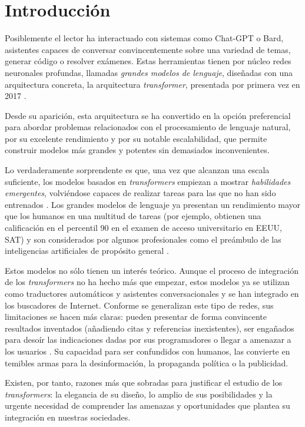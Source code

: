 \cleardoublepage

\chapter{Introducción}
Posiblemente el lector ha interactuado con sistemas como Chat-GPT o Bard, asistentes capaces de conversar convincentemente sobre una variedad de temas, generar código o resolver exámenes. Estas herramientas tienen por núcleo redes neuronales profundas, llamadas \textit{grandes modelos de lenguaje}, diseñadas con una arquitectura concreta, la arquitectura \textit{transformer}, presentada por primera vez en 2017 \cite{vaswani2017attention}.

Desde su aparición, esta arquitectura se ha convertido en la opción preferencial para abordar problemas relacionados con el procesamiento de lenguaje natural, por su excelente rendimiento y por su notable escalabilidad, que permite construir modelos más grandes y potentes sin demasiados inconvenientes. 

Lo verdaderamente sorprendente es que, una vez que alcanzan una escala suficiente, los modelos basados en \textit{transformers} empiezan a mostrar \textit{habilidades emergentes}, volviéndose capaces de realizar tareas para las que no han sido entrenados \cite{wei2022emergent}. Los grandes modelos de lenguaje ya presentan un rendimiento mayor que los humanos en una multitud de tareas (por ejemplo, obtienen una calificación en el percentil 90 en el examen de acceso universitario en EEUU, SAT) y son considerados por algunos profesionales como el preámbulo de las inteligencias artificiales de propósito general \cite{bubeck2023sparks}.

Estos modelos no sólo tienen un interés teórico. Aunque el proceso de integración de los \textit{transformers} no ha hecho más que empezar, estos modelos ya se utilizan como traductores automáticos y asistentes conversacionales y se han integrado en los buscadores de Internet. Conforme se generalizan este tipo de redes, sus limitaciones se hacen más claras: pueden presentar de forma convincente resultados inventados (añadiendo citas y referencias inexistentes), ser engañados para desoír las indicaciones dadas por sus programadores o llegar a amenazar a los usuarios \cite{gpthallucination,gptthreats}. Su capacidad para ser confundidos con humanos, las convierte en temibles armas para la desinformación, la propaganda política o la publicidad. 

Existen, por tanto, razones más que sobradas para justificar el estudio de los \textit{transformers}: la elegancia de su diseño, lo amplio de sus posibilidades y  la urgente necesidad de comprender las amenazas y oportunidades que plantea su integración en nuestras sociedades.

